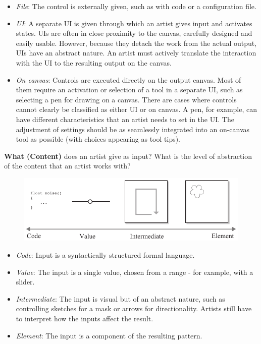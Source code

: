 \begin{itemize}
    \item \textit{File}: The control is externally given, such as with code or a configuration file.
    \item \textit{UI}: A separate UI is given through which an artist gives input and activates states. UIs are often in close proximity to the canvas, carefully designed and easily usable. However, because they detach the work from the actual output, UIs have an abstract nature. An artist must actively translate the interaction with the UI to the resulting output on the canvas.
    \item \textit{On canvas}: Controls are executed directly on the output canvas. Most of them require an activation or selection of a tool in a separate UI, such as selecting a pen for drawing on a canvas. 
    There are cases where controls cannot clearly be classified as either UI or on canvas. A pen, for example, can have different characteristics that an artist needs to set in the UI. The adjustment of settings should be as seamlessly integrated into an on-canvas tool as possible (\eg with choices appearing as tool tips). 
\end{itemize}

\newpage
\noindent\textbf{What (Content)} does an artist give as input? What is the level of abstraction of the content that an artist works with?
\begin{figure}[H]
    \centering
        \includegraphics[width=\controlParamsFigWidth\linewidth]{figures/control_paradigms/what.pdf}
\end{figure}

\begin{itemize}
    \item \textit{Code}: Input is a syntactically structured formal language.
    \item \textit{Value}: The input is a single value, chosen from a range - for example, with a slider.
    \item \textit{Intermediate}: The input is visual but of an abstract nature, such as controlling sketches for a mask or arrows for directionality. Artists still have to interpret how the inputs affect the result.
    \item \textit{Element}: The input is a component of the resulting pattern.
\end{itemize}

